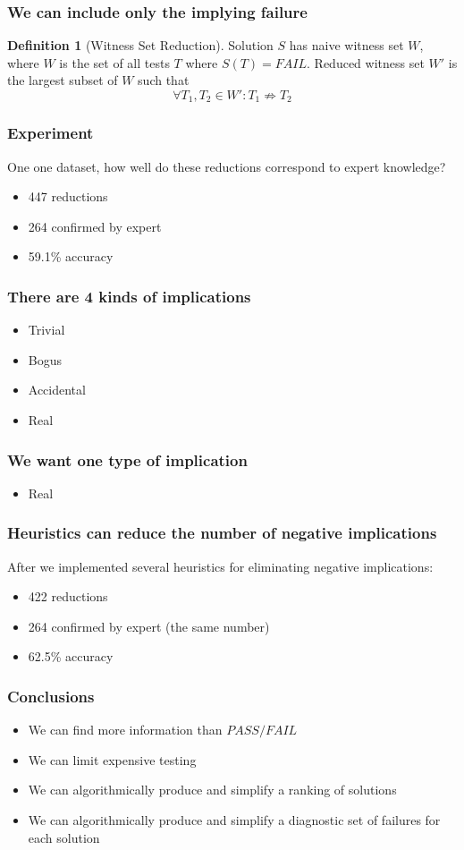 \documentclass[svgnames,14pt]{beamer}
\newcommand\fail{\mathit{FAIL}}
\newcommand\pass{\mathit{PASS}}
\theoremstyle{definition}
\newtheorem{defn}{Definition}
\begin{document}
\begin{frame}
\frametitle{We can include only the implying failure}
\begin{defn}[Witness Set Reduction]
Solution $S$ has naive witness set $W$, where $W$ is the set of all tests $T$ where $S(T) = \fail$.
Reduced witness set $W'$ is the largest subset of $W$ such that
$$\forall T_1, T_2 \in W' : T_1 \not\Rightarrow T_2$$
\end{defn}
\end{frame}

\begin{frame}
\frametitle{Experiment}
One one dataset, how well do these reductions correspond to expert knowledge?
\end{frame}

\begin{frame}
\begin{itemize}
\item 447 reductions
\item 264 confirmed by expert
\item 59.1\% accuracy
\end{itemize}
\end{frame}

\begin{frame}
\frametitle{There are 4 kinds of implications}
\begin{itemize}
\item Trivial
\item Bogus
\item Accidental
\item Real
\end{itemize}
\end{frame}

\begin{frame}
\frametitle{We want one type of implication}
\begin{itemize}
\item Real
\end{itemize}
\end{frame}

\begin{frame}
\frametitle{Heuristics can reduce the number of negative implications}
After we implemented several heuristics for eliminating negative implications:
\begin{itemize}
\item 422 reductions
\item 264 confirmed by expert (the same number)
\item 62.5\% accuracy
\end{itemize}
\end{frame}

\begin{frame}
\frametitle{Conclusions}
\begin{itemize}
\item We can find more information than $\pass/\fail$
\item We can limit expensive testing
\item We can algorithmically produce and simplify a ranking of solutions
\item We can algorithmically produce and simplify a diagnostic set of failures for each solution
\end{itemize}
\end{frame}
\end{document}
